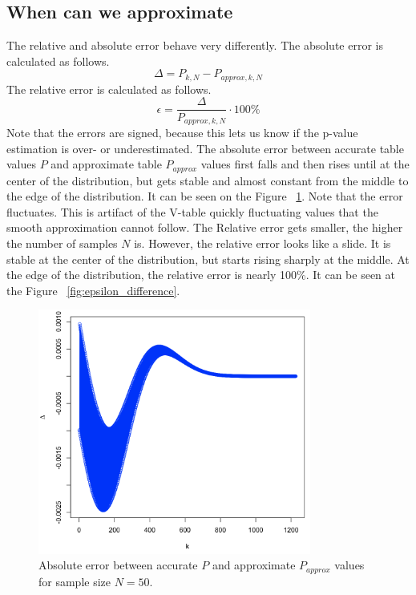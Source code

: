 \documentclass[12pt]{article}
\begin{document}
{\subsection{When can we approximate}
The relative and absolute error behave very differently. The absolute error is calculated as follows.
\begin{equation}
  \Delta = P_{k, N} - P_{approx, k, N}
\end{equation}
The relative error is calculated as follows.
\begin{equation}\label{eq:relative_error}
  \epsilon = \frac{\Delta}{P_{approx, k, N}} \cdot 100\%
\end{equation}
Note that the errors are signed, because this lets us know if the p-value estimation is over- or underestimated.
The absolute error between accurate table values $P$ and approximate table $P_{approx}$ values first falls and then rises until at the center of the distribution, but gets stable and almost constant from the middle to the edge of the distribution. It can be seen on the Figure ~\ref{fig:absolute_difference}. Note that the error fluctuates. This is artifact of the V-table quickly fluctuating values that the smooth approximation cannot follow. The Relative error gets smaller, the higher the number of samples $N$ is. However, the relative error looks like a slide. It is stable at the center of the distribution, but starts rising sharply at the middle. At the edge of the distribution, the relative error is nearly 100\%. It can be seen at the Figure ~\ref{fig:epsilon_difference}.

\begin{figure}[H]
  \centering
  \includegraphics[width=0.8\textwidth]{approximate_accurate_difference}
  \caption{Absolute error between accurate $P$ and approximate $P_{approx}$ values for sample size $N=50$.}
  \label{fig:absolute_difference}
\end{figure}

}
\end{document}
